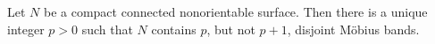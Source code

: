 Let $N$ be a compact connected nonorientable surface. Then there is a unique integer $p > 0$ such that $N$ contains $p$, but not $p + 1$, disjoint Möbius bands.
